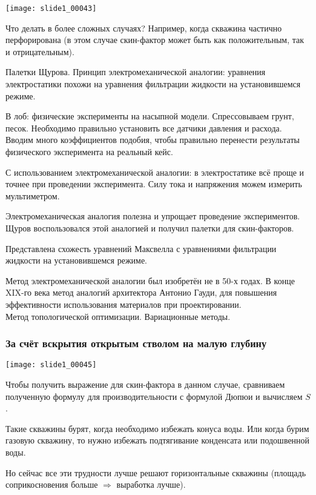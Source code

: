 \documentclass[main.tex]{subfiles}
\begin{document}
\texttt{[image: slide1\_00043]}

Что делать в более сложных случаях? Например, когда скважина частично перфорирована (в этом случае скин-фактор может быть как положительным, так и отрицательным).

Палетки Щурова. Принцип электромеханической аналогии: уравнения электростатики похожи на уравнения фильтрации жидкости на установившемся режиме.

В лоб: физические эксперименты на насыпной модели. Спрессовываем грунт, песок. Необходимо правильно установить все датчики давления и расхода. Вводим много коэффициентов подобия, чтобы правильно перенести результаты физического эксперимента на реальный кейс.

С использованием электромеханической аналогии: в электростатике всё проще и точнее при проведении эксперимента. Силу тока и напряжения можем измерить мультиметром.

Электромеханическая аналогия полезна и упрощает проведение экспериментов. Щуров воспользовался этой аналогией и получил палетки для скин-факторов.


Представлена схожесть уравнений Максвелла с уравнениями фильтрации жидкости на установившемся режиме.


Метод электромеханической аналогии был изобретён не в 50-х годах. В конце XIX-го века метод аналогий архитектора Антонио Гауди, для повышения эффективности использования материалов при проектировании.\\

Метод топологической оптимизации. Вариационные методы.

\subsubsection{За счёт вскрытия открытым стволом на малую глубину}

\texttt{[image: slide1\_00045]}

Чтобы получить выражение для скин-фактора в данном случае, сравниваем полученную формулу для производительности с формулой Дюпюи и вычисляем $S$.

Такие скважины бурят, когда необходимо избежать конуса воды. Или когда бурим газовую скважину, то нужно избежать подтягивание конденсата или подошвенной воды.

Но сейчас все эти трудности лучше решают горизонтальные скважины (площадь соприкосновения больше $\Rightarrow$ выработка лучше).
\end{document}
